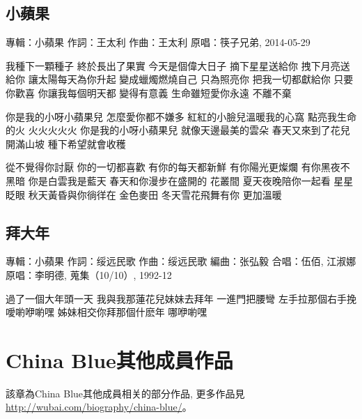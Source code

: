 \documentclass[UTF8,a4paper,oneside,twocolumn,12pt]{ctexbook}
\newcommand{\infopair}[2]{\textbullet #1：#2}
\newcommand{\zc}[1][伍佰]{\infopair{作詞}{#1}}
\newcommand{\zq}[1][伍佰]{\infopair{作曲}{#1}}
\newcommand{\bq}[1][伍佰]{\infopair{編曲}{#1}}
\newcommand{\zj}[1]{\infopair{專輯}{#1}}
\newcommand{\yc}[1]{\infopair{原唱}{#1}}
\newcommand{\sj}[1]{\infopair{時間}{#1}}
\newenvironment{info}{\begin{flushleft}\kaishu
	}
	{\end{flushleft}\normalsize\yahei\par}
\newenvironment{lyric}{
	}
{}
\begin{document}
\section{小蘋果}
\begin{info}
	\zj{小蘋果}
	\zc[王太利]
	\zq[王太利]
	\yc{筷子兄弟, 2014-05-29}
\end{info}
\begin{lyric}
	我種下一顆種子 終於長出了果實
	今天是個偉大日子
	摘下星星送給你 拽下月亮送給你
	讓太陽每天為你升起
	變成蠟燭燃燒自己 只為照亮你
	把我一切都獻給你 只要你歡喜
	你讓我每個明天都 變得有意義
	生命雖短愛你永遠 不離不棄

	你是我的小呀小蘋果兒
	怎麼愛你都不嫌多
	紅紅的小臉兒溫暖我的心窩
	點亮我生命的火 火火火火火
	你是我的小呀小蘋果兒
	就像天邊最美的雲朵
	春天又來到了花兒開滿山坡
	種下希望就會收穫

	從不覺得你討厭 你的一切都喜歡
	有你的每天都新鮮
	有你陽光更燦爛 有你黑夜不黑暗
	你是白雲我是藍天
	春天和你漫步在盛開的 花叢間
	夏天夜晚陪你一起看 星星眨眼
	秋天黃昏與你徜徉在 金色麥田
	冬天雪花飛舞有你 更加溫暖
\end{lyric}

\section{拜大年} %
\begin{info}
	\zj{小蘋果}
	\zc[绥远民歌] %
	\zq[绥远民歌]
	\bq[张弘毅]
	\infopair{合唱}{伍佰, 江淑娜}
	\yc{李明德, 蒐集（10/10）, 1992-12}
\end{info}
\begin{lyric}
	過了一個大年頭一天
	我與我那蓮花兒妹妹去拜年
	一進門把腰彎
	左手拉那個右手挽
	噯喲咿喲嘿
	姊妹相交你拜那個什麽年
	哪咿喲嘿
\end{lyric}

\chapter{China Blue其他成員作品}
該章為China Blue其他成員相关的部分作品, 更多作品見 \url{http://wubai.com/biography/china-blue/}。%
\end{document}
